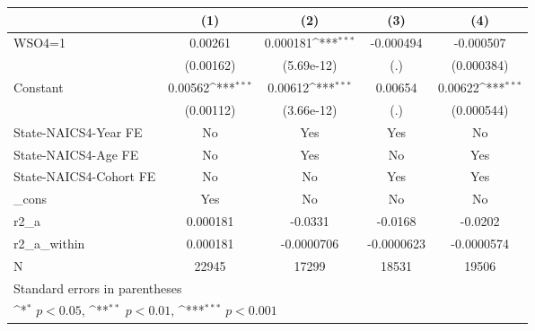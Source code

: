 {
\def\sym#1{\ifmmode^{#1}\else\(^{#1}\)\fi}
\begin{tabular}{l*{4}{c}}
\hline\hline
                    &\multicolumn{1}{c}{(1)}         &\multicolumn{1}{c}{(2)}         &\multicolumn{1}{c}{(3)}         &\multicolumn{1}{c}{(4)}         \\
\hline
WSO4=1              &     0.00261         &    0.000181\sym{***}&   -0.000494         &   -0.000507         \\
                    &   (0.00162)         &  (5.69e-12)         &         (.)         &  (0.000384)         \\
[1em]
Constant            &     0.00562\sym{***}&     0.00612\sym{***}&     0.00654         &     0.00622\sym{***}\\
                    &   (0.00112)         &  (3.66e-12)         &         (.)         &  (0.000544)         \\
[1em]
State-NAICS4-Year FE&          No         &         Yes         &         Yes         &          No         \\
[1em]
State-NAICS4-Age FE &          No         &         Yes         &          No         &         Yes         \\
[1em]
State-NAICS4-Cohort FE&          No         &          No         &         Yes         &         Yes         \\
[1em]
\_cons              &         Yes         &          No         &          No         &          No         \\
\hline
r2\_a                &    0.000181         &     -0.0331         &     -0.0168         &     -0.0202         \\
r2\_a\_within         &    0.000181         &  -0.0000706         &  -0.0000623         &  -0.0000574         \\
N                   &       22945         &       17299         &       18531         &       19506         \\
\hline\hline
\multicolumn{5}{l}{\footnotesize Standard errors in parentheses}\\
\multicolumn{5}{l}{\footnotesize \sym{*} \(p<0.05\), \sym{**} \(p<0.01\), \sym{***} \(p<0.001\)}\\
\end{tabular}
}
